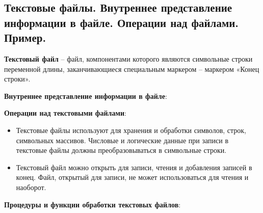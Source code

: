 


\newpage\subsection{Текстовые  файлы.  Внутреннее  представление  информации  в  файле.  Операции  над  файлами. Пример. }

\begin{myquote}
            
\end{myquote}


{\bf {Текстовый файл}} – файл, компонентами которого являются символьные строки переменной длины, заканчивающиеся специальным маркером – маркером «Конец строки». 
 
{\bf {Внутреннее представление информации в файле}}:

{\bf {Операции над текстовыми файлами}}:
\begin{itemize}
\item Текстовые файлы используют для хранения и обработки символов, строк, символьных массивов. Числовые и логические данные при записи в текстовые файлы должны преобразовываться в символьные строки.
\item Текстовый файл можно открыть для записи, чтения и добавления записей в конец. Файл, открытый для записи, не может использоваться для чтения и наоборот. 
\end{itemize}

{\bf {Процедуры и функции обработки текстовых файлов}}: 


